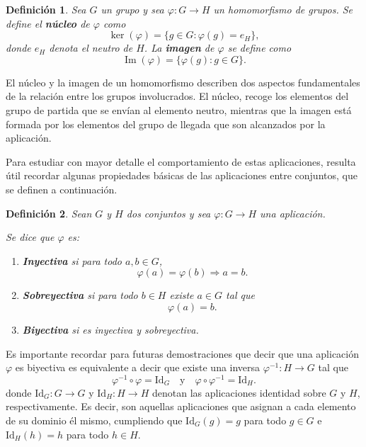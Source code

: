 \documentclass[11pt,a4paper,spanish]{report}
\theoremstyle{plain}
\newtheorem{definicion}{Definición}[chapter]
\begin{document}
\begin{definicion}\cite{dummit2004abstract}
Sea $G$ un grupo y sea $\varphi : G \to H$ un homomorfismo de grupos.  
Se define el \textbf{núcleo} de $\varphi$ como
\[
\ker(\varphi)=\{g\in G : \varphi(g)=e_H\},
\]
donde $e_H$ denota el neutro de $H$.  
La \textbf{imagen} de $\varphi$ se define como
\[
\operatorname{Im}(\varphi)=\{\varphi(g): g\in G\}.
\]
\end{definicion}

El núcleo y la imagen de un homomorfismo describen dos aspectos 
fundamentales de la relación entre los grupos involucrados.
El núcleo, recoge los elementos del grupo de partida que se envían 
al elemento neutro, mientras que la imagen está formada por 
los elementos del grupo de llegada que son alcanzados por la aplicación.

Para estudiar con mayor detalle el comportamiento de estas aplicaciones, 
resulta útil recordar algunas propiedades básicas de las aplicaciones 
entre conjuntos, que se definen a continuación.

\begin{definicion}\cite{dummit2004abstract}
Sean $G$ y $H$ dos conjuntos y sea $\varphi : G \to H$ una aplicación.

Se dice que $\varphi$ es:

\begin{enumerate}

    \item[(i)]\textbf{Inyectiva} si para todo $a, b \in G$,
    \[
    \varphi(a) = \varphi(b) \Rightarrow a = b.
    \]

    \item[(ii)]\textbf{Sobreyectiva} si para todo $b \in H$ existe $a \in G$ tal que
    \[
   \varphi(a) = b.
    \]

   \item[(iii)]\textbf{Biyectiva} si es inyectiva y sobreyectiva.
\end{enumerate}
\end{definicion}

Es importante recordar para futuras demostraciones que decir que una aplicación $\varphi$ es biyectiva es equivalente a decir que existe una inversa $\varphi^{-1} : H \to G$ tal que
\[
\varphi^{-1} \circ \varphi = \mathrm{Id}_G
\quad \text{y} \quad
\varphi \circ \varphi^{-1} = \mathrm{Id}_H.
\]
donde $\mathrm{Id}_G : G \to G$ y $\mathrm{Id}_H : H \to H$ denotan las aplicaciones identidad sobre $G$ y $H$, respectivamente. Es decir, son aquellas aplicaciones que asignan a cada elemento de su dominio él mismo, cumpliendo que $\mathrm{Id}_G(g) = g$ para todo $g \in G$ e $\mathrm{Id}_H(h) = h$ para todo $h \in H$.
\end{document}

